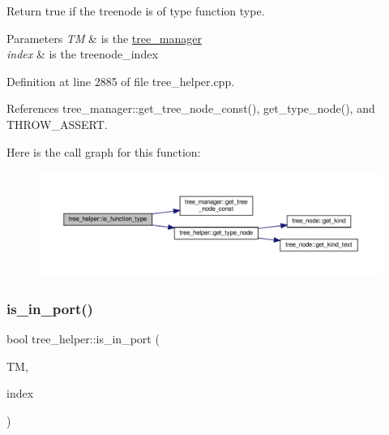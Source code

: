 Return true if the treenode is of type function type. 


\begin{DoxyParams}{Parameters}
{\em TM} & is the \hyperlink{classtree__manager}{tree\+\_\+manager} \\
\hline
{\em index} & is the treenode\+\_\+index \\
\hline
\end{DoxyParams}


Definition at line 2885 of file tree\+\_\+helper.\+cpp.



References tree\+\_\+manager\+::get\+\_\+tree\+\_\+node\+\_\+const(), get\+\_\+type\+\_\+node(), and T\+H\+R\+O\+W\+\_\+\+A\+S\+S\+E\+RT.

Here is the call graph for this function\+:
\nopagebreak
\begin{figure}[H]
\begin{center}
\leavevmode
\includegraphics[width=350pt]{d7/d99/classtree__helper_aaee6527f97763e85b8cf0446e92f562c_cgraph}
\end{center}
\end{figure}
\mbox{\label{classtree__helper_abb9469aca01d23ad785ffac3b5ce64de}} 
\subsubsection{\texorpdfstring{is\+\_\+in\+\_\+port()}{is\_in\_port()}}
{\footnotesize\ttfamily bool tree\+\_\+helper\+::is\+\_\+in\+\_\+port (\begin{DoxyParamCaption}\item[{const \hyperlink{tree__manager_8hpp_a792e3f1f892d7d997a8d8a4a12e39346}{tree\+\_\+manager\+Const\+Ref} \&}]{TM,  }\item[{const unsigned int}]{index }\end{DoxyParamCaption})\hspace{0.3cm}{\ttfamily [static]}}



